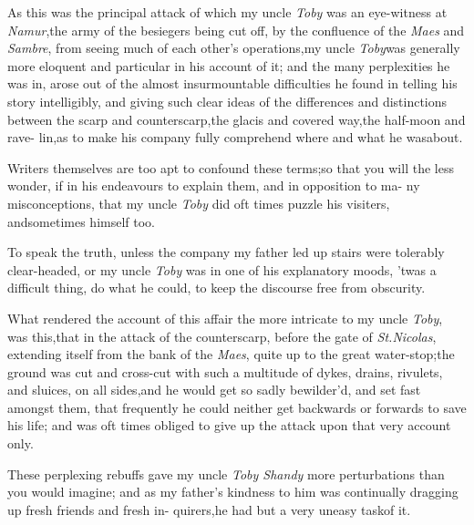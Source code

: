 \documentclass{article}
\begin{document}
As this was the principal attack of which my uncle \textit{Toby}
was an eye-witness at \textit{Namur},\tsh the army of the
besiegers being cut off, by the confluence of the \textit{Maes}
and \textit{Sambre}, from seeing much of each other’s
operations,\tsk my uncle \textit{Toby}\break was generally more
eloquent and particular in his account of it; and the many
perplexities he was in, arose out of the\break
almost insurmountable difficulties he\break
found in telling his story intelligibly,\break
and giving such clear ideas of the differences and distinctions
between the scarp and counterscarp,\tsh the glacis and
covered way,\tsh the half-moon and rave-\break
lin,\tsh as to make his company fully\break
comprehend where and what he was\break about.

Writers themselves are too apt to confound these terms;\tsh so that
you will the less wonder, if in his endeavours to explain them, and
in opposition to ma- ny misconceptions, that my uncle \textit{Toby} did
oft times puzzle his visiters, and\break sometimes himself too.

To speak the truth, unless the compa\-ny my father led up stairs
were tolerably clear-headed, or my uncle \textit{Toby} was in one of
his explanatory moods, ’twas a difficult thing, do what he could, to keep the
discourse free from obscurity.

What rendered the account of this\break 
affair the more intricate to my uncle\break
\textit{Toby}, was this,\tsk that in the attack of the
counterscarp, before the gate of \textit{St.\@ Nicolas}, extending
itself from the bank of the \textit{Maes}, quite up to the great
water-stop;\tsk the ground was cut and cross-cut with such a
multitude of dykes, drains, rivulets, and sluices, on all
sides,\tsk and he would get so sadly bewilder’d, and set fast
amongst them, that frequently he could neither get backwards or
forwards to save his life; and was oft times obliged to give up the
attack upon that very account only.

These perplexing rebuffs gave my\break
uncle \textit{Toby Shandy} more perturbations\break
than you would imagine; and as my\break
father’s kindness to him was continually\break
dragging up fresh friends and fresh in-\break 
quirers,\tsk he had but a very uneasy task\break of it.
\end{document}
